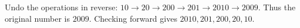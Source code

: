 Undo the operations in reverse: $10\to20\to200\to201\to2010\to2009$. Thus the original number is $\boxed{2009}$. Checking forward gives $2010,201,200,20,10$.
